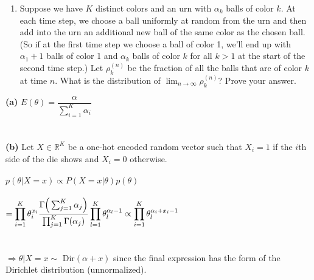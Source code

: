 \documentclass[submit]{harvardml}
\newcommand{\R}{\mathbb{R}}
\begin{document}
\begin{problem}
\begin{enumerate}[label=(\alph*)]
\item Suppose we have $K$ distinct colors and an urn with $\alpha_k$ balls of color $k$. At each time step, we choose a ball uniformly at random from the urn and then add into the urn an additional new ball of the same color as the chosen ball. (So if at the first time step we choose a ball of color 1, we'll end up with $\alpha_1+1$ balls of color 1 and $\alpha_k$ balls of color $k$ for all $k > 1$ at the start of the second time step.) Let $\rho_{k}^{(n)}$ be the fraction of all the balls that are of color $k$ at time $n$. What is the distribution of $\lim_{n \rightarrow \infty} \rho_k^{(n)}$? Prove your answer.
\end{enumerate}
\vspace{0.1cm}
\end{problem}





\textbf{(a)} $E(\theta)=\dfrac{\alpha}{\sum_{i=1}^{K}\alpha_i}$\\\\\\

\textbf{(b)} Let $X\in\R^{K}$ be a one-hot encoded random vector such that $X_i=1$ if the $i$th side of the die shows and $X_i=0$ otherwise.\\\\
$p(\theta|X=x)\propto P(X=x|\theta)p(\theta)$\\\\
$=\displaystyle\prod_{i=1}^{K}\theta_i^{x_i}\dfrac{\Gamma\Big(\sum_{j=1}^{K}\alpha_j\Big)}{\prod_{j=1}^{K}\Gamma(\alpha_j)}\displaystyle\prod_{l=1}^{K}\theta_l^{\alpha_l-1}\\\\\\
\propto\displaystyle\prod_{i=1}^{K}\theta_l^{\alpha_i+x_i-1}$\\\\\\
$\Rightarrow \theta|X=x\sim$ Dir$(\alpha+x)$ since the final expression has the form of the Dirichlet distribution (unnormalized).\\\\\\
\end{document}
